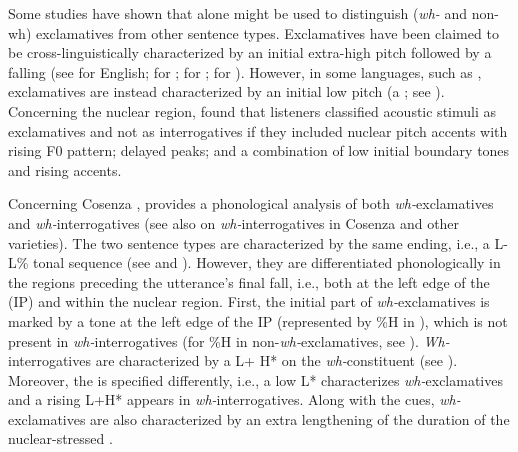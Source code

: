 \documentclass[output=paper]{langsci/langscibook}
\begin{document}
Some studies have shown that  alone might be used to distinguish (\textit{wh-} and non-wh) exclamatives from other sentence types. Exclamatives have been claimed to be cross-linguistically characterized by an initial extra-high pitch followed by a falling  (see \citealt{OConnor.1961} for English; \citealt{Delattre1966} for ; \citealt{DEugenio1976} for ; \citealt{Batliner1988} for ). However, in some languages, such as , exclamatives are instead characterized by an initial low pitch (a ; see \citealt{Gyuris2013}). Concerning the nuclear region, \citet{Gyuris2013} found that  listeners classified acoustic stimuli as exclamatives and not as interrogatives if they included nuclear pitch accents with rising F0 pattern; delayed peaks; and a combination of low initial boundary tones and rising accents.

Concerning Cosenza , \citet{Sorianello2011exclamative} provides a phonological analysis of both \textit{wh-}exclamatives and \textit{wh-}interrogatives (see also \citet[182]{GiliFivelaETAL2015intonationalvariation} on \textit{wh-}interrogatives in Cosenza  and other  varieties). The two sentence types are characterized by the same ending, i.e., a L-L\% tonal sequence (see  and ).  However, they are differentiated phonologically in the regions preceding the utterance’s final fall, i.e., both at the left edge of the  (IP) and within the nuclear region. First, the initial part of \textit{wh-}exclamatives is marked by a  tone at the left edge of the IP (represented by \%H in ), which is not present in \textit{wh-}interrogatives (for \%H in non-\textit{wh-}exclamatives, see \citealt{Sorianello2012,Avesani1995,Grice2005}). \textit{Wh-}interrogatives are characterized by a  L+ H* on the \textit{wh-}constituent (see ). Moreover, the  is specified differently, i.e., a low  L* characterizes \textit{wh-}exclamatives and a rising  L+H* appears in \textit{wh-}interrogatives. Along with the  cues, \textit{wh-}exclamatives are also characterized by an extra lengthening of the duration of the nuclear-stressed  \citep{Sorianello2011exclamative}.
\end{document}
